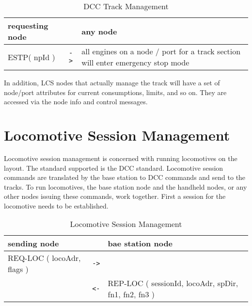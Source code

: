 \begin{table}[ht!]
    \begin{center}
        \caption{DCC Track Management}
        \begin{tabular}{|p{} c p{}|}
            \toprule
            \textbf{requesting node} & & \textbf{ any node} \\
            \midrule
            ESTP( npId ) & \texttt{->} & all engines on a node / port for a track section will enter emergency stop mode  \\
            \bottomrule
        \end{tabular}
    \end{center}
\end{table}

In addition, LCS nodes that actually manage the track will have a set of node/port attributes for current consumptions, limits, and so on. They are accessed via the node info and control messages.

\section{Locomotive Session Management}

Locomotive session management is concerned with running locomotives on the layout. The standard supported is the DCC standard. Locomotive session commands are translated by the base station to DCC commands and send to the tracks. To run locomotives, the base station node and the handheld nodes, or any other nodes issuing these commands,  work together. First a session for the locomotive needs to be established.

\begin{table}[ht!]
    \begin{center}
        \caption{Locomotive Session Management}
        \begin{tabular}{|p{} c p{}|}
            \toprule
            \textbf{sending node} & & \textbf{ bae station node} \\
            \midrule
            REQ-LOC ( locoAdr, flags ) & \texttt{->} &  \\
            \midrule
            & \texttt{<-} & REP-LOC ( sessionId, locoAdr, spDir, fn1, fn2, fn3 ) \\
            \bottomrule
        \end{tabular}
    \end{center}
\end{table}

